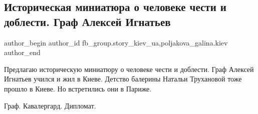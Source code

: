 
 
 
 
 
 
\subsection{Историческая миниатюра о человеке чести и доблести. Граф Алексей Игнатьев}
\label{sec:20_12_2021.fb.fb_group.story_kiev_ua.1.graf_aleksej_ignatjev}
 
\ifcmt
 author_begin
   author_id fb_group.story_kiev_ua,poljakova_galina.kiev
 author_end
\fi

Предлагаю историческую миниатюру о человеке чести и доблести. Граф Алексей
Игнатьев учился и жил в Киеве. Детство балерины Натальи Трухановой тоже прошло
в Киеве. Но встретились они в Париже. 

Граф. Кавалергард.  Дипломат. 

